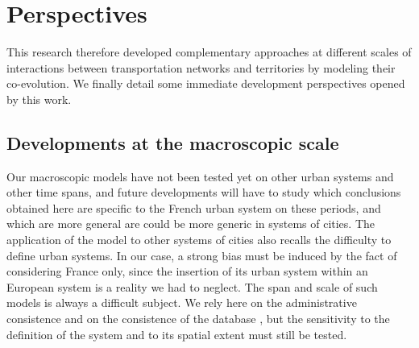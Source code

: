 \documentclass[11pt]{article}
\begin{document}
\section{Perspectives}

This research therefore developed complementary approaches at different scales of interactions between transportation networks and territories by modeling their co-evolution. We finally detail some immediate development perspectives opened by this work.


\subsection{Developments at the macroscopic scale}

Our macroscopic models have not been tested yet on other urban systems and other time spans, and future developments will have to study which conclusions obtained here are specific to the French urban system on these periods, and which are more general are could be more generic in systems of cities. The application of the model to other systems of cities also recalls the difficulty to define urban systems. In our case, a strong bias must be induced by the fact of considering France only, since the insertion of its urban system within an European system is a reality we had to neglect. The span and scale of such models is always a difficult subject. We rely here on the administrative consistence and on the consistence of the database \citep{pumain1986fichier}, but the sensitivity to the definition of the system and to its spatial extent must still be tested.
\end{document}
